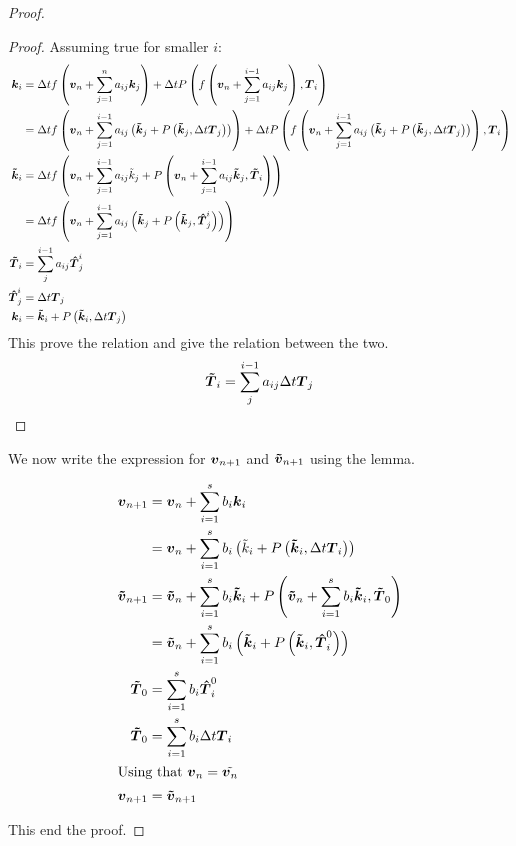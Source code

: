 \begin{proof}
\begin{proof}
Assuming true for smaller $i$:
\begin{align*}
  {\boldsymbol {k}}_{i}&=\Delta tf\left({\boldsymbol {v}}_n+\sum_{j=1}^{n}a_{ij}{\boldsymbol {k}}_{j}\right)+\Delta tP\left(f\left({\boldsymbol {v}}_n+\sum_{j=1}^{i-1}a_{ij}{\boldsymbol {k}}_{j}\right),{\boldsymbol {T}}_{i}\right)\\
  &=\Delta tf\left({\boldsymbol {v}}_n+\sum_{j=1}^{i-1}a_{ij}\left({\boldsymbol {\tilde{k}}}_{j}+P\left({\boldsymbol {\tilde{k}}}_{j},\Delta t {\boldsymbol {T}}_{j}\right)\right)\right)+\Delta tP\left(f\left({\boldsymbol {v}}_n+\sum_{j=1}^{i-1}a_{ij}\left({\boldsymbol {\tilde{k}}}_{j}+P\left({\boldsymbol {\tilde{k}}}_{j},\Delta t {\boldsymbol {T}}_{j}\right)\right)\right),{\boldsymbol {T}}_{i}\right)\\
  {\boldsymbol {\tilde{k}}}_{i}&=\Delta tf\left({\boldsymbol {v}}_n+\sum_{j=1}^{i-1}a_{ij}\tilde{k}_{j}+P\left({\boldsymbol {v}}_n+\sum_{j=1}^{i-1}a_{ij}{\boldsymbol {\tilde{k}}}_{j},{\boldsymbol {{\boldsymbol {\tilde{T}}}}}_{i}\right)\right)\\
  &=\Delta tf\left({\boldsymbol {v}}_n+\sum_{j=1}^{i-1}a_{ij}\left({\boldsymbol {\tilde{k}}}_{j}+P\left({\boldsymbol {\tilde{k}}}_{j},{\boldsymbol {\hat{T}}}_{j}^{i}\right)\right)\right)\\
  {\boldsymbol {\tilde{T}}}_i&=\sum_{j}^{i-1}a_{ij}{\boldsymbol {\hat{T}}}_{j}^{i}\\
  {\boldsymbol {\hat{T}}}^{i}_{j}&=\Delta t {\boldsymbol {T}}_{j}\\
  {\boldsymbol {k}}_{i}&={\boldsymbol {\tilde{k}}}_{i}+P\left({\boldsymbol {\tilde{k}}}_{i},\Delta t{\boldsymbol {T}}_j\right)
\end{align*}
This prove the relation and give the relation between the two.
\begin{equation}
  {\boldsymbol {\tilde{T}}}_i=\sum_{j}^{i-1}a_{ij}\Delta t {\boldsymbol {T}}_{j}
\end{equation}
\end{proof}

We now write the expression for ${\boldsymbol {v}}_{n+1}$ and ${\boldsymbol {\tilde{v}}}_{n+1}$ using the lemma.

\begin{align*}
{\boldsymbol {v}}_{n+1}&={\boldsymbol {v}}_{n}+\sum_{i=1}^{s}b_{i}{\boldsymbol {k}}_{i}\\
&={\boldsymbol {v}}_{n}+\sum_{i=1}^{s}b_{i}\left(\tilde{k}_{i}+P\left({\boldsymbol {\tilde{k}}}_{i},\Delta t{\boldsymbol {T}}_{i}\right)\right)\\
{\boldsymbol {\tilde{v}}}_{n+1}&={\boldsymbol {\tilde{v}}}_{n}+\sum_{i=1}^{s}b_{i}{\boldsymbol {\tilde{k}}}_{i}+P\left({\boldsymbol {\tilde{v}}}_{n}+\sum_{i=1}^{s}b_{i}{\boldsymbol {\tilde{k}}}_{i},{\boldsymbol {\tilde{T}}}_{0}\right)\\
&={\boldsymbol {\tilde{v}}}_{n}+\sum_{i=1}^{s}b_{i}\left({\boldsymbol {\tilde{k}}}_{i}+P\left({\boldsymbol {\tilde{k}}}_{i},{\boldsymbol {\hat{T}}}_{i}^{0}\right)\right)\\
{\boldsymbol {\tilde{T}}}_{0}&=\sum_{i=1}^{s}b_{i}{\boldsymbol {\hat{T}}}_{i}^{0}\\
{\boldsymbol {\tilde{T}}}_{0}&=\sum_{i=1}^{s}b_{i}\Delta t {\boldsymbol {T}}_{i}\\
\intertext{Using that ${\boldsymbol {v}}_{n}=\tilde{{\boldsymbol {v}}_{n}}$}
{\boldsymbol {v}}_{n+1}&={\boldsymbol {\tilde{v}}}_{n+1}
\end{align*}

This end the proof.

\end{proof}

